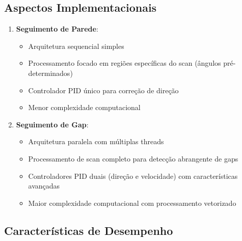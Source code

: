 \subsection{Aspectos Implementacionais}

\begin{enumerate}
    \item \textbf{Seguimento de Parede}:
          \begin{itemize}
              \item Arquitetura sequencial simples
              \item Processamento focado em regiões específicas do scan (ângulos pré-determinados)
              \item Controlador PID único para correção de direção
              \item Menor complexidade computacional
          \end{itemize}

    \item \textbf{Seguimento de Gap}:
          \begin{itemize}
              \item Arquitetura paralela com múltiplas threads
              \item Processamento de scan completo para detecção abrangente de gaps
              \item Controladores PID duais (direção e velocidade) com características avançadas
              \item Maior complexidade computacional com processamento vetorizado
          \end{itemize}
\end{enumerate}

\subsection{Características de Desempenho}

